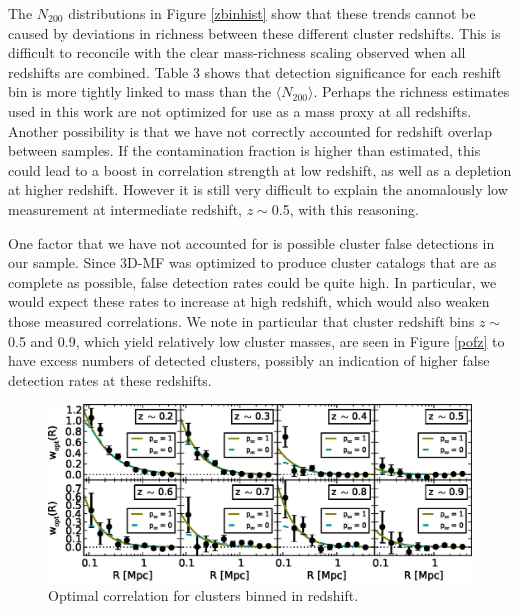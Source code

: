The $N_{200}$ distributions in Figure \ref{zbinhist} show that these trends cannot be caused by deviations in richness between these different cluster redshifts. This is difficult to reconcile with the clear mass-richness scaling observed when all redshifts are combined. Table 3 shows that detection significance for each reshift bin is more tightly linked to mass than the $\langle N_{200} \rangle$. Perhaps the richness estimates used in this work are not optimized for use as a mass proxy at all redshifts. Another possibility is that we have not correctly accounted for redshift overlap between samples. If the contamination fraction is higher than estimated, this could lead to a boost in correlation strength at low redshift, as well as a depletion at higher redshift. However it is still very difficult to explain the anomalously low measurement at intermediate redshift, $z \sim$0.5, with this reasoning.

One factor that we have not accounted for is possible cluster false detections in our sample. Since 3D-MF was optimized to produce cluster catalogs that are as complete as possible, false detection rates could be quite high. In particular, we would expect these rates to increase at high redshift, which would also weaken those measured correlations. We note in particular that cluster redshift bins $z \sim$ 0.5 and 0.9, which yield relatively low cluster masses, are seen in Figure \ref{pofz} to have excess numbers of detected clusters, possibly an indication of higher false detection rates at these redshifts.


\begin{figure}
\begin{center}
\includegraphics[scale=0.9]{plots_ch3/wopt_z_panels_U.eps}
\caption[Magnification for Redshift-Binned Clusters]{Optimal correlation for clusters binned in redshift.}
\label{zbinw}
\end{center}
\end{figure}



